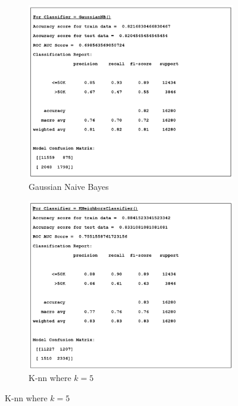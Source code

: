 \documentclass{article}
\begin{document}
\begin{figure}
  \centering
  \begin{subfigure}[b]{0.5\textwidth}
      \centering
      \includegraphics[width=\textwidth]{gnb_uci.PNG}
      \caption{Gaussian Naive Bayes}
      \label{fig:y equals x}
  \end{subfigure}
  \hfill
  \begin{subfigure}[b]{0.5\textwidth}
      \centering
      \includegraphics[width=\textwidth]{knn_uci.PNG}
      \caption{K-nn where $k = 5$}
      \label{fig:three sin x}

\end{subfigure}
\end{figure}
\end{document}
